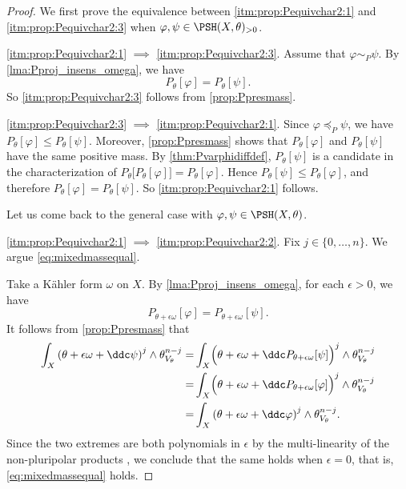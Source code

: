 \begin{proof}
    We first prove the equivalence between \ref{itm:prop:Pequivchar2:1} and \ref{itm:prop:Pequivchar2:3} when $\varphi,\psi\in \PSH(X,\theta)_{>0}$.

    \ref{itm:prop:Pequivchar2:1} $\implies$ \ref{itm:prop:Pequivchar2:3}. Assume that $\varphi\sim_P \psi$. By \cref{lma:Pproj_insens_omega}, we have
    \[
        P_{\theta}[\varphi]=P_{\theta}[\psi].
    \]
    So \ref{itm:prop:Pequivchar2:3} follows from \cref{prop:Ppresmass}.

    \ref{itm:prop:Pequivchar2:3} $\implies$ \ref{itm:prop:Pequivchar2:1}. Since $\varphi\preceq_P\psi$, we have $P_{\theta}[\varphi]\leq P_{\theta}[\psi]$.
    Moreover, \cref{prop:Ppresmass} shows that $P_{\theta}[\varphi]$ and $P_{\theta}[\psi]$ have the same positive mass.
    By \cref{thm:Pvarphidiffdef}, $P_{\theta}[\psi]$ is a candidate in the characterization of $P_{\theta}\bigl[P_{\theta}[\varphi]\bigr]=P_{\theta}[\varphi]$.
    Hence $P_{\theta}[\psi]\leq P_{\theta}[\varphi]$, and therefore $P_{\theta}[\varphi]=P_{\theta}[\psi]$.
    So \ref{itm:prop:Pequivchar2:1} follows.

    Let us come back to the general case with $\varphi,\psi\in \PSH(X,\theta)$.

    \ref{itm:prop:Pequivchar2:1} $\implies$ \ref{itm:prop:Pequivchar2:2}.
    Fix $j\in \{0,\ldots,n\}$. We argue \eqref{eq:mixedmassequal}.

    Take a Kähler form $\omega$ on $X$. By \cref{lma:Pproj_insens_omega}, for each $\epsilon>0$, we have
    \[
        P_{\theta+\epsilon\omega}[\varphi]=  P_{\theta+\epsilon\omega}[\psi].
    \]
    It follows from \cref{prop:Ppresmass} that
    \[
        \begin{aligned}
        \int_X \left(\theta+\epsilon\omega+\ddc \psi  \right)^j\wedge \theta_{V_{\theta}}^{n-j}=&\int_X \Bigl(\theta+\epsilon\omega+\ddc P_{\theta+\epsilon\omega}[\psi]  \Bigr)^j\wedge \theta_{V_{\theta}}^{n-j}\\
        =&\int_X \Bigl(\theta+\epsilon\omega+\ddc P_{\theta+\epsilon\omega}[\varphi]  \Bigr)^j\wedge \theta_{V_{\theta}}^{n-j} \\
        =& \int_X \left(\theta+\epsilon\omega+\ddc \varphi  \right)^j\wedge \theta_{V_{\theta}}^{n-j}.
        \end{aligned}
    \]
    Since the two extremes are both polynomials in $\epsilon$ by the multi-linearity of the non-pluripolar products , we conclude that the same holds when $\epsilon=0$, that is, \eqref{eq:mixedmassequal} holds.


\end{proof}
